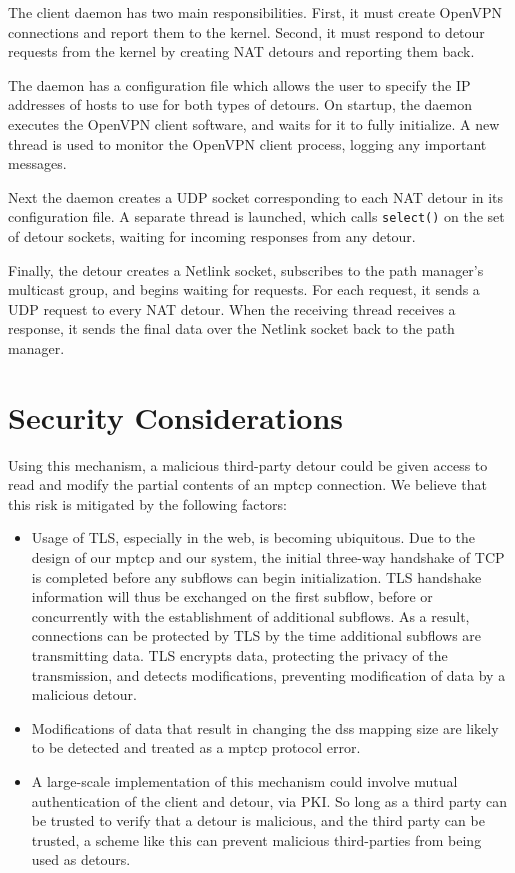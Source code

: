 \documentclass{cwru}
\begin{document}
The client daemon has two main responsibilities. First, it must create OpenVPN
connections and report them to the kernel. Second, it must respond to detour
requests from the kernel by creating NAT detours and reporting them back.

The daemon has a configuration file which allows the user to specify the IP
addresses of hosts to use for both types of detours. On startup, the daemon
executes the OpenVPN client software, and waits for it to fully initialize. A
new thread is used to monitor the OpenVPN client process, logging any important
messages.

Next the daemon creates a UDP socket corresponding to each NAT detour in its
configuration file. A separate thread is launched, which calls \texttt{select()}
on the set of detour sockets, waiting for incoming responses from any detour.

Finally, the detour creates a Netlink socket, subscribes to the path manager's
multicast group, and begins waiting for requests. For each request, it sends a
UDP request to every NAT detour. When the receiving thread receives a response,
it sends the final data over the Netlink socket back to the path manager.

\section{Security Considerations}

Using this mechanism, a malicious third-party detour could be given access to
read and modify the partial contents of an \ac{mptcp} connection. We believe
that this risk is mitigated by the following factors:

\begin{itemize}
\item Usage of TLS, especially in the web, is becoming ubiquitous. Due to the
  design of our \ac{mptcp} and our system, the initial three-way handshake of
  TCP is completed before any subflows can begin initialization. TLS handshake
  information will thus be exchanged on the first subflow, before or
  concurrently with the establishment of additional subflows. As a result,
  connections can be protected by TLS by the time additional subflows are
  transmitting data. TLS encrypts data, protecting the privacy of the
  transmission, and detects modifications, preventing modification of data by a
  malicious detour.
\item Modifications of data that result in changing the \ac{dss} mapping size
  are likely to be detected and treated as a \ac{mptcp} protocol error.
\item A large-scale implementation of this mechanism could involve mutual
  authentication of the client and detour, via PKI. So long as a third party can
  be trusted to verify that a detour is malicious, and the third party can be
  trusted, a scheme like this can prevent malicious third-parties from being
  used as detours.
\end{itemize}
\end{document}
